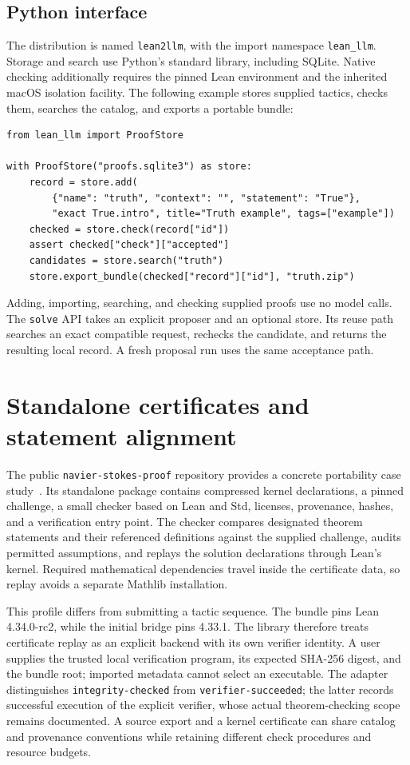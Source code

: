 \documentclass[10pt,a4paper]{article}
\newcommand{\code}[1]{\texttt{#1}}
\begin{document}
\subsection{Python interface}
The distribution is named \code{lean2llm}, with the import namespace
\code{lean\_llm}. Storage and search use Python's standard library, including
SQLite. Native checking additionally requires the pinned Lean environment and
the inherited macOS isolation facility. The following example stores supplied
tactics, checks them, searches the catalog, and exports a portable bundle:
\begin{lstlisting}
from lean_llm import ProofStore

with ProofStore("proofs.sqlite3") as store:
    record = store.add(
        {"name": "truth", "context": "", "statement": "True"},
        "exact True.intro", title="Truth example", tags=["example"])
    checked = store.check(record["id"])
    assert checked["check"]["accepted"]
    candidates = store.search("truth")
    store.export_bundle(checked["record"]["id"], "truth.zip")
\end{lstlisting}
Adding, importing, searching, and checking supplied proofs use no model calls.
The \code{solve} API takes an explicit proposer and an optional store. Its reuse
path searches an exact compatible request, rechecks the candidate, and returns
the resulting local record. A fresh proposal run uses the same acceptance path.

\section{Standalone certificates and statement alignment}
The public \code{navier-stokes-proof} repository provides a concrete portability
case study~\cite{sulea-certificates}. Its standalone package contains compressed
kernel declarations, a pinned challenge, a small checker based on Lean and Std,
licenses, provenance, hashes, and a verification entry point. The checker
compares designated theorem statements and their referenced definitions against
the supplied challenge, audits permitted assumptions, and replays the solution
declarations through Lean's kernel. Required mathematical dependencies travel
inside the certificate data, so replay avoids a separate Mathlib installation.

This profile differs from submitting a tactic sequence. The bundle pins Lean
4.34.0-rc2, while the initial bridge pins 4.33.1. The library therefore treats
certificate replay as an explicit backend with its own verifier identity. A
user supplies the trusted local verification program, its expected SHA-256
digest, and the bundle root; imported metadata cannot select an executable.
The adapter distinguishes \code{integrity-checked} from
\code{verifier-succeeded}; the latter records successful execution of the
explicit verifier, whose actual theorem-checking scope remains documented.
A source export and a kernel certificate
can share catalog and provenance conventions while retaining different check
procedures and resource budgets.
\end{document}
